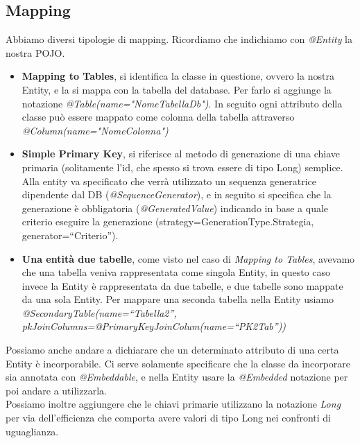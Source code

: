 \subsection{Mapping}
Abbiamo diversi tipologie di mapping. Ricordiamo che indichiamo con \textit{@Entity} la nostra POJO.
\begin{itemize}
    \item \textbf{Mapping to Tables}, si identifica la classe in questione, ovvero la nostra Entity, e la si mappa con la tabella del database. Per farlo si aggiunge la notazione \textit{@Table(name="NomeTabellaDb")}. In seguito ogni attributo della classe può essere mappato come colonna della tabella attraverso \textit{@Column(name="NomeColonna")}
    \item \textbf{Simple Primary Key}, si riferisce al metodo di generazione di una chiave primaria (solitamente l'id, che spesso si trova essere di tipo Long) semplice. Alla entity va specificato che verrà utilizzato un sequenza generatrice dipendente dal DB (\textit{@SequenceGenerator}), e in seguito si specifica che la generazione è obbligatoria (\textit{@GeneratedValue}) indicando in base a quale criterio eseguire la generazione (strategy=GenerationType.Strategia, generator=“Criterio”).  
    \item \textbf{Una entità due tabelle}, come visto nel caso di \textit{Mapping to Tables}, avevamo che una tabella veniva rappresentata come singola Entity, in questo caso invece la Entity è rappresentata da due tabelle, e due tabelle sono mappate da una sola Entity. Per mappare una seconda tabella nella Entity usiamo \textit{@SecondaryTable(name=“Tabella2”, pkJoinColumns={@PrimaryKeyJoinColum(name=“PK2Tab”)})}
\end{itemize}

Possiamo anche andare a dichiarare che un determinato attributo di una certa Entity è incorporabile. Ci serve solamente specificare che la classe da incorporare sia annotata con \textit{@Embeddable}, e nella Entity usare la \textit{@Embedded} notazione per poi andare a utilizzarla.\\

Possiamo inoltre aggiungere che le chiavi primarie utilizzano la notazione \textit{Long} per via dell'efficienza che comporta avere valori di tipo Long nei confronti di uguaglianza. \\

